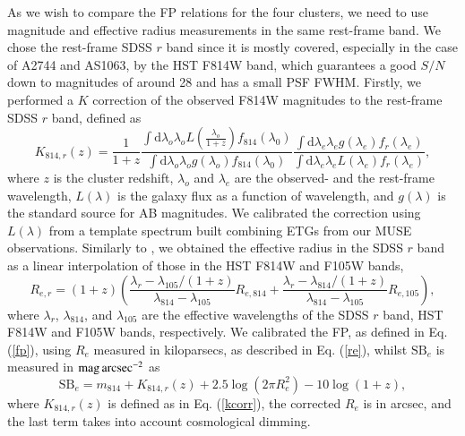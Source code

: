 \documentclass{aa}
\begin{document}
As we wish to compare the FP relations for the four clusters, we need to use magnitude and effective radius measurements in the same rest-frame band. We chose the rest-frame SDSS $r$ band since it is mostly covered, especially in the case of A2744 and AS1063, by the HST F814W band, which guarantees a good $S/N$ down to magnitudes of around 28 and has a small PSF FWHM. Firstly, we performed a $K$ correction of the observed F814W magnitudes to the rest-frame SDSS $r$ band, defined as \citep[e.g.][]{hogg02}
\begin{equation}\label{kcorr}
    K_{814,r} (z)= \frac{1}{1+z} \frac{\int \mathrm{d}\lambda_o \lambda_o L\left(\frac{\lambda_o}{1+z}\right)f_{814}(\lambda_0)}{\int \mathrm{d}\lambda_o \lambda_o g\left(\lambda_o\right)f_{814}(\lambda_0)} \frac{\int \mathrm{d}\lambda_e \lambda_e g(\lambda_e)f_r(\lambda_e)}{\int \mathrm{d}\lambda_e \lambda_e L\left(\lambda_e\right)f_r(\lambda_e)},
\end{equation}
where $z$ is the cluster redshift, $\lambda_o$ and $\lambda_e$ are the observed- and the rest-frame wavelength, $L(\lambda)$ is the galaxy flux as a function of wavelength, and $g(\lambda)$ is the standard source for AB magnitudes. We calibrated the correction using $L(\lambda)$ from a template spectrum built combining ETGs from our MUSE observations. Similarly to \citet{grillo10}, we obtained the effective radius in the SDSS $r$ band as a linear interpolation of those in the HST F814W and F105W bands,
\begin{equation}\label{re}
    R_{e,r}=(1+z)\left(\frac{\lambda_{r}-\lambda_{105}/(1+z)}{\lambda_{814}-\lambda_{105}}R_{e,814}+\frac{\lambda_{r}-\lambda_{814}/(1+z)}{\lambda_{814}-\lambda_{105}}R_{e,105}\right),
\end{equation}
where $\lambda_r$, $\lambda_{814}$, and $\lambda_{105}$ are the effective wavelengths of the SDSS $r$ band, HST F814W and F105W bands, respectively. We calibrated the FP, as defined in Eq. (\ref{fp}), using $R_e$ measured in kiloparsecs, as described in Eq. (\ref{re}), whilst $\mathrm{SB}_e$ is measured in $\rm mag \,arcsec^{-2}$ as
\begin{equation}
    \mathrm{SB}_e = m_{814} +  K_{814,r} (z) + 2.5 \log(2\pi R_e^2) - 10 \log(1+z),
\end{equation}
where $K_{814,r} (z)$ is defined as in Eq. (\ref{kcorr}), the corrected $R_e$ is in arcsec, and the last term takes into account cosmological dimming.
\end{document}
